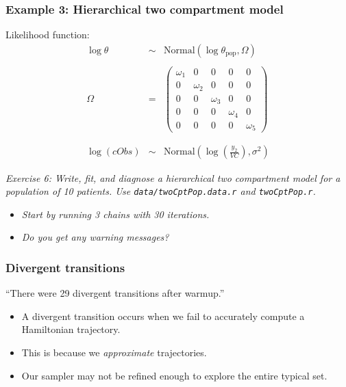 \documentclass[xcolor=table]{beamer}
\begin{document}
\begin{frame}
  \frametitle{Example 3: Hierarchical two compartment model}
  
  Likelihood function:
  \begin{eqnarray*}
    \log \theta & \sim & \mathrm{Normal}(\log \theta_\mathrm{pop}, \Omega) \\ \\
    \Omega & = & \left(\begin{array}{ccccc} 
                            \omega_1 & 0 & 0 & 0 & 0 \\
                            0 & \omega_2 & 0 & 0 & 0 \\
                            0 & 0 & \omega_3 & 0 & 0 \\
                            0 & 0 & 0 & \omega_4 & 0 \\
                            0 & 0 & 0 & 0 & \omega_5
                            \end{array} \right) \\ \\ \\
    \log (cObs) & \sim & \mathrm{Normal}\left(\log \left(\frac{y_2}{VC} \right), \sigma^2 \right)
  \end{eqnarray*}
  
\end{frame}

\begin{frame}

  \textit{\textcolor{MRGGreen}{Exercise 6}: Write, fit, and diagnose a hierarchical two
     compartment model for a population of 10 patients.
     Use \texttt{data/twoCptPop.data.r} and \texttt{twoCptPop.r}.}
     \begin{itemize}
       \item \textit{Start by running 3 chains with 30 iterations.}
       \item \textit{Do you get any warning messages?}
     \end{itemize}
   
\end{frame}

\begin{frame}
  \frametitle{Divergent transitions}
  
   ``There were 29 divergent transitions after warmup.''
   
   \begin{itemize}
     \item A divergent transition occurs when we fail to accurately compute
     a Hamiltonian trajectory.
     \item This is because we \textit{approximate} trajectories.
     \item Our sampler may not be refined enough to explore the entire typical set.
   \end{itemize}

\end{frame}
\end{document}
